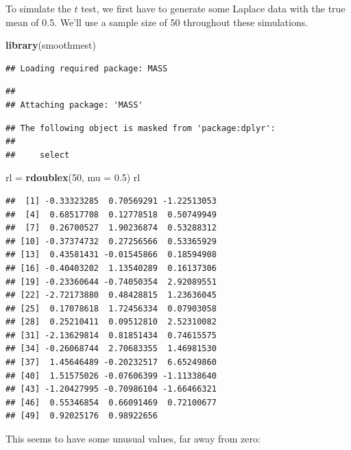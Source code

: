 \documentclass[]{tufte-book}
\newenvironment{Shaded}{}{}
\newcommand{\DataTypeTok}[1]{\textcolor[rgb]{0.56,0.13,0.00}{#1}}
\newcommand{\DecValTok}[1]{\textcolor[rgb]{0.25,0.63,0.44}{#1}}
\newcommand{\FloatTok}[1]{\textcolor[rgb]{0.25,0.63,0.44}{#1}}
\newcommand{\KeywordTok}[1]{\textcolor[rgb]{0.00,0.44,0.13}{\textbf{#1}}}
\newcommand{\NormalTok}[1]{#1}
\newcommand{\OperatorTok}[1]{\textcolor[rgb]{0.40,0.40,0.40}{#1}}
\newcommand{\StringTok}[1]{\textcolor[rgb]{0.25,0.44,0.63}{#1}}
\theoremstyle{definition}
\theoremstyle{definition}
\theoremstyle{definition}
\theoremstyle{remark}
\begin{document}
To simulate the \(t\) test, we first have to generate some Laplace data
with the true mean of 0.5. We'll use a sample size of 50 throughout
these simulations.

\begin{Shaded}
\begin{Highlighting}[]
\KeywordTok{library}\NormalTok{(smoothmest)}
\end{Highlighting}
\end{Shaded}

\begin{verbatim}
## Loading required package: MASS
\end{verbatim}

\begin{verbatim}
## 
## Attaching package: 'MASS'
\end{verbatim}

\begin{verbatim}
## The following object is masked from 'package:dplyr':
## 
##     select
\end{verbatim}

\begin{Shaded}
\begin{Highlighting}[]
\NormalTok{rl =}\StringTok{ }\KeywordTok{rdoublex}\NormalTok{(}\DecValTok{50}\NormalTok{, }\DataTypeTok{mu =} \FloatTok{0.5}\NormalTok{)}
\NormalTok{rl}
\end{Highlighting}
\end{Shaded}

\begin{verbatim}
##  [1] -0.33323285  0.70569291 -1.22513053
##  [4]  0.68517708  0.12778518  0.50749949
##  [7]  0.26700527  1.90236874  0.53288312
## [10] -0.37374732  0.27256566  0.53365929
## [13]  0.43581431 -0.01545866  0.18594908
## [16] -0.40403202  1.13540289  0.16137306
## [19] -0.23360644 -0.74050354  2.92089551
## [22] -2.72173880  0.48428815  1.23636045
## [25]  0.17078618  1.72456334  0.07903058
## [28]  0.25210411  0.09512810  2.52310082
## [31] -2.13629814  0.81851434  0.74615575
## [34] -0.26068744  2.70683355  1.46981530
## [37]  1.45646489 -0.20232517  6.65249860
## [40]  1.51575026 -0.07606399 -1.11338640
## [43] -1.20427995 -0.70986104 -1.66466321
## [46]  0.55346854  0.66091469  0.72100677
## [49]  0.92025176  0.98922656
\end{verbatim}

This seems to have some unusual values, far away from zero:

\begin{Shaded}
\end{Shaded}
\end{document}
